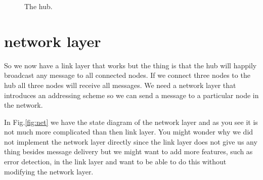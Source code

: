 \documentclass[a4paper,11pt]{article}
\begin{document}
\begin{figure}
\centering  
{}
\caption{The hub.}
\label{fig:hub}
\end{figure}


\section{network layer}

So we now have a link layer that works but the thing is that the hub
will happily broadcast any message to all connected nodes. If we
connect three nodes to the hub all three nodes will receive all
messages. We need a network layer that introduces an addressing scheme
so we can send a message to a particular node in the network.

In Fig.\ref{fig:net} we have the state diagram of the network layer
and as you see it is not much more complicated than then link
layer. You might wonder why we did not implement the network layer
directly since the link layer does not give us any thing besides
message delivery but we might want to add more features, such as error
detection, in the link layer and want to be able to do this without
modifying the network layer.
\end{document}

